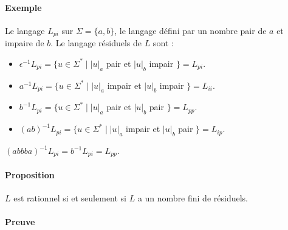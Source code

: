 

\paragraph{Exemple} %
\label{par:exemple}

Le langage $L_{pi}$ sur $\Sigma = \{a,b\}$, le langage défini par un nombre pair de $a$ et impaire de $b$. Le langage résiduels de $L$ sont :

\begin{itemize}
	\item $\epsilon^{-1}L_{pi} = \{ u \in \Sigma^* \mid \left|u\right|_a$ pair et $ \left|u\right|_b$ impair $ \} = L_{pi}$.
	\item $a^{-1}L_{pi} = \{ u \in \Sigma^* \mid \left|u\right|_a$ impair et $ \left|u\right|_b$ impair $ \} = L_{ii}$.
	\item $b^{-1}L_{pi} = \{ u \in \Sigma^* \mid \left|u\right|_a$ pair et $ \left|u\right|_b$ pair $ \} = L_{pp}$.
	\item $(ab)^{-1}L_{pi} = \{ u \in \Sigma^* \mid \left|u\right|_a$ impair et $ \left|u\right|_b$ pair $ \} = L_{ip}$.\\
\end{itemize}

$(abbba)^{-1}L_{pi} = b^{-1} L_{pi} = L_{pp}$.



\paragraph{Proposition} %
\label{par:proposition}

$L$ est rationnel si et seulement si $L$ a un nombre fini de résiduels.



\paragraph{Preuve} %
\label{par:preuve}

